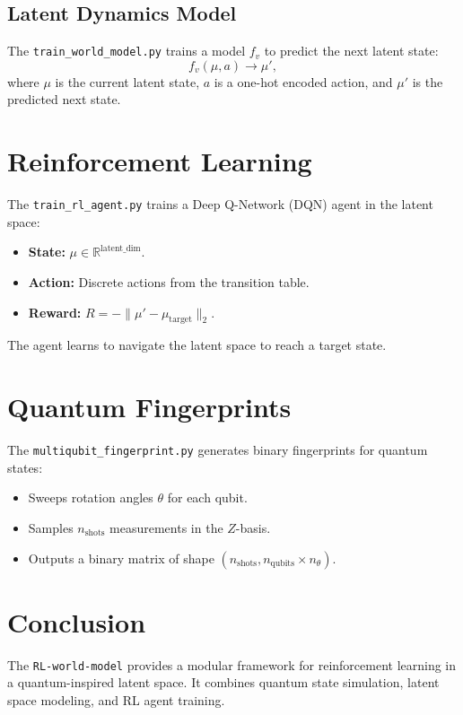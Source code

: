 \documentclass{article}
\begin{document}
\subsection*{Latent Dynamics Model}
The \texttt{train\_world\_model.py} trains a model $f_v$ to predict the next latent state:
\[
f_v(\mu, a) \to \mu',
\]
where $\mu$ is the current latent state, $a$ is a one-hot encoded action, and $\mu'$ is the predicted next state.

\section*{Reinforcement Learning}
The \texttt{train\_rl\_agent.py} trains a Deep Q-Network (DQN) agent in the latent space:
\begin{itemize}
    \item \textbf{State:} $\mu \in \mathbb{R}^{\text{latent\_dim}}$.
    \item \textbf{Action:} Discrete actions from the transition table.
    \item \textbf{Reward:} $R = -\|\mu' - \mu_{\text{target}}\|_2$.
\end{itemize}
The agent learns to navigate the latent space to reach a target state.

\section*{Quantum Fingerprints}
The \texttt{multiqubit\_fingerprint.py} generates binary fingerprints for quantum states:
\begin{itemize}
    \item Sweeps rotation angles $\theta$ for each qubit.
    \item Samples $n_{\text{shots}}$ measurements in the $Z$-basis.
    \item Outputs a binary matrix of shape $(n_{\text{shots}}, n_{\text{qubits}} \times n_{\theta})$.
\end{itemize}

\section*{Conclusion}
The \texttt{RL-world-model} provides a modular framework for reinforcement learning in a quantum-inspired latent space. It combines quantum state simulation, latent space modeling, and RL agent training.
\end{document}
